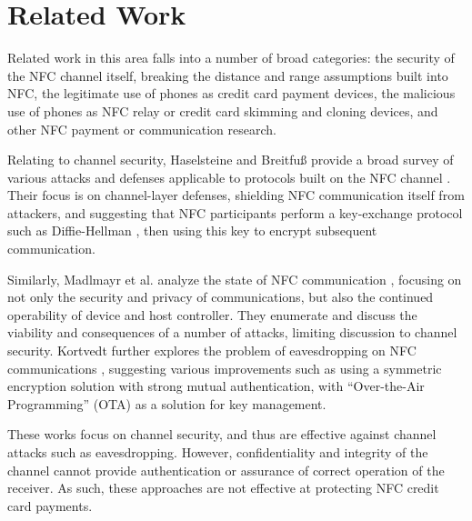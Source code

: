 \section{Related Work}
\label{sec:related}


Related work in this area falls into a number of broad categories:
     the security of the NFC channel itself,
     breaking the distance and range assumptions built into NFC,
     the legitimate use of phones as credit card payment devices,
     the malicious use of phones as NFC relay or credit card skimming and cloning devices,
     and other NFC payment or communication research.



Relating to channel security, Haselsteine and Breitfu{\ss} provide a broad survey of various attacks and defenses applicable to protocols built on the NFC channel \cite{haselsteiner2006security}.
Their focus is on channel-layer defenses, shielding NFC communication itself from attackers,
    and suggesting that NFC participants perform a key-exchange protocol such as Diffie-Hellman \cite{diffiehellman},
    then using this key to encrypt subsequent communication.

Similarly, Madlmayr et al. analyze the state of NFC communication \cite{madlmayr2008nfc},
    focusing on not only the security and privacy of communications, but also the continued operability of device and host controller.
They enumerate and discuss the viability and consequences of a number of attacks, limiting discussion to channel security.
Kortvedt further explores the problem of eavesdropping on NFC communications \cite{kortvedt2009securing},
    suggesting various improvements such as using a symmetric encryption solution with strong mutual authentication,
    with ``Over-the-Air Programming'' (OTA) as a solution for key management.

These works \cite{haselsteiner2006security, kortvedt2009securing, madlmayr2008nfc} focus on channel security,
    and thus are effective against channel attacks such as eavesdropping.
However, confidentiality and integrity of the channel cannot provide authentication or assurance of correct operation of the receiver.
As such, these approaches are not effective at protecting NFC credit card payments.

